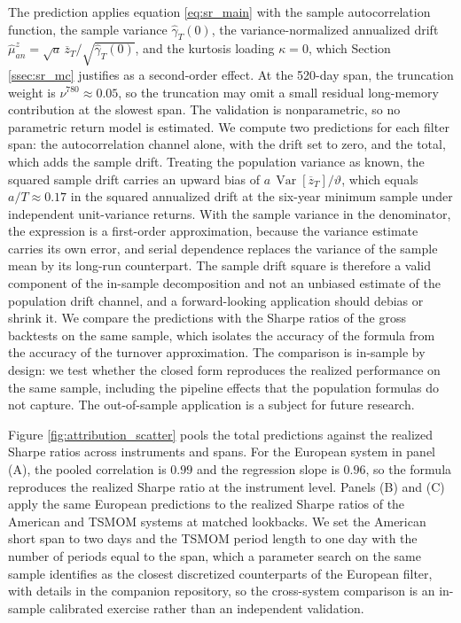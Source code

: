 \documentclass[hidelinks]{siamonline250211}
\DeclareMathOperator{\Var}{Var}
\begin{document}
The prediction applies equation \eqref{eq:sr_main} with the sample autocorrelation function, the sample variance $\hat{\gamma}_{T}(0)$, the variance-normalized annualized drift $\hat{\mu}^{z}_{an} = \sqrt{a}\,\overline{z}_{T}/\sqrt{\hat{\gamma}_{T}(0)}$, and the kurtosis loading $\kappa=0$, which Section \ref{ssec:sr_mc} justifies as a second-order effect. At the 520-day span, the truncation weight is $\nu^{780} \approx 0.05$, so the truncation may omit a small residual long-memory contribution at the slowest span. The validation is nonparametric, so no parametric return model is estimated. We compute two predictions for each filter span: the autocorrelation channel alone, with the drift set to zero, and the total, which adds the sample drift. Treating the population variance as known, the squared sample drift carries an upward bias of $a\,\Var[\overline{z}_{T}]/\vartheta$, which equals $a/T \approx 0.17$ in the squared annualized drift at the six-year minimum sample under independent unit-variance returns. With the sample variance in the denominator, the expression is a first-order approximation, because the variance estimate carries its own error, and serial dependence replaces the variance of the sample mean by its long-run counterpart. The sample drift square is therefore a valid component of the in-sample decomposition and not an unbiased estimate of the population drift channel, and a forward-looking application should debias or shrink it. We compare the predictions with the Sharpe ratios of the gross backtests on the same sample, which isolates the accuracy of the formula from the accuracy of the turnover approximation. The comparison is in-sample by design: we test whether the closed form reproduces the realized performance on the same sample, including the pipeline effects that the population formulas do not capture. The out-of-sample application is a subject for future research.

Figure \ref{fig:attribution_scatter} pools the total predictions against the realized Sharpe ratios across instruments and spans. For the European system in panel (A), the pooled correlation is $0.99$ and the regression slope is $0.96$, so the formula reproduces the realized Sharpe ratio at the instrument level. Panels (B) and (C) apply the same European predictions to the realized Sharpe ratios of the American and TSMOM systems at matched lookbacks. We set the American short span to two days and the TSMOM period length to one day with the number of periods equal to the span, which a parameter search on the same sample identifies as the closest discretized counterparts of the European filter, with details in the companion repository, so the cross-system comparison is an in-sample calibrated exercise rather than an independent validation.
\end{document}
